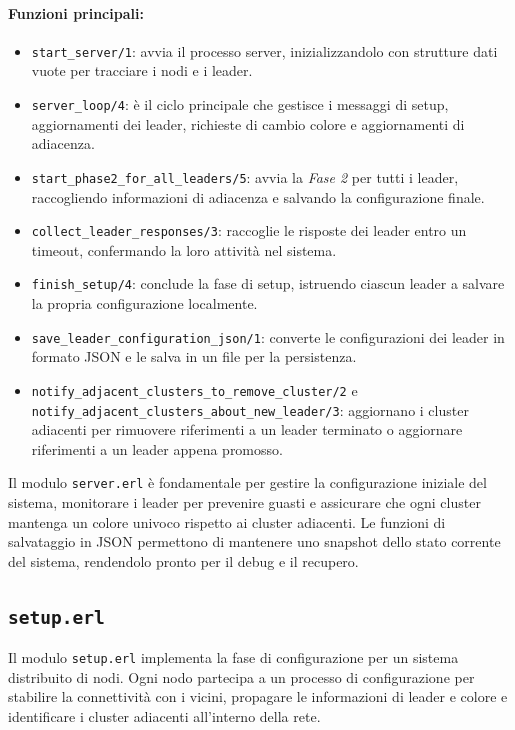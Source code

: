 \documentclass[12pt, a4paper]{report}
\begin{document}
\paragraph{Funzioni principali:}
\begin{itemize}
    \item \texttt{start\_server/1}: avvia il processo server, inizializzandolo con strutture dati vuote per tracciare i nodi e i leader.
    \item \texttt{server\_loop/4}: \`e il ciclo principale che gestisce i messaggi di setup, aggiornamenti dei leader, richieste di cambio colore e aggiornamenti di adiacenza.
    \item \texttt{start\_phase2\_for\_all\_leaders/5}: avvia la \textit{Fase 2} per tutti i leader, raccogliendo informazioni di adiacenza e salvando la configurazione finale.
    \item \texttt{collect\_leader\_responses/3}: raccoglie le risposte dei leader entro un timeout, confermando la loro attività nel sistema.
    \item \texttt{finish\_setup/4}: conclude la fase di setup, istruendo ciascun leader a salvare la propria configurazione localmente.
    \item \texttt{save\_leader\_configuration\_json/1}: converte le configurazioni dei leader in formato JSON e le salva in un file per la persistenza.
    \item \texttt{notify\_adjacent\_clusters\_to\_remove\_cluster/2} e \\ \texttt{notify\_adjacent\_clusters\_about\_new\_leader/3}: aggiornano i cluster adiacenti per rimuovere riferimenti a un leader terminato o aggiornare riferimenti a un leader appena promosso.
\end{itemize}

\noindent
Il modulo \texttt{server.erl} è fondamentale per gestire la configurazione iniziale del sistema, monitorare i leader per prevenire guasti e assicurare che ogni cluster mantenga un colore univoco rispetto ai cluster adiacenti. Le funzioni di salvataggio in JSON permettono di mantenere uno snapshot dello stato corrente del sistema, rendendolo pronto per il debug e il recupero.

\subsection{\texttt{setup.erl}}

Il modulo \texttt{setup.erl} implementa la fase di configurazione per un sistema distribuito di nodi. Ogni nodo partecipa a un processo di configurazione per stabilire la connettività con i vicini, propagare le informazioni di leader e colore e identificare i cluster adiacenti all'interno della rete.
\end{document}
